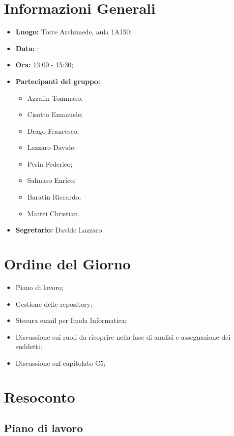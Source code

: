 \section{Informazioni Generali}
\begin{itemize}
\item \textbf{Luogo:} Torre Archimede, aula 1A150;
\item \textbf{Data:} \Data;
\item \textbf{Ora:} 13:00 - 15:30;
\item \textbf{Partecipanti del gruppo:}
	\begin{itemize}
	\item Azzalin Tommaso; 
	\item Cisotto Emanuele; 
	\item Drago Francesco;
	\item Lazzaro Davide;
	\item Perin Federico;
	\item Salmaso Enrico;
	\item Baratin Riccardo;
	\item Mattei Christian.
	\end{itemize} 
\item \textbf{Segretario:} Davide Lazzaro.
\end{itemize}

\clearpage

\section{Ordine del Giorno}
\begin{itemize}
\item Piano di lavoro;
\item Gestione delle repository;
\item Stesura email per Imola Informatica;
\item Discussione sui ruoli da ricoprire nella fase di analisi e assegnazione dei suddetti;
\item Discussione sul capitolato C5;
\end{itemize}

\clearpage

\section{Resoconto}
\subsection{Piano di lavoro}

